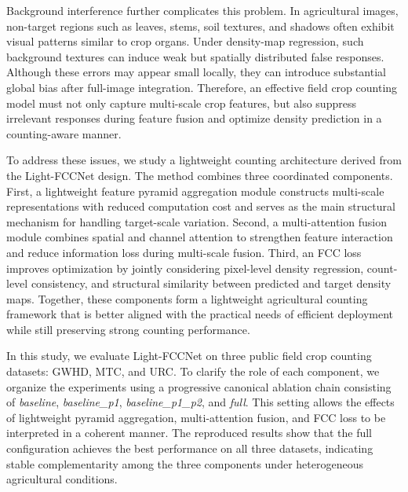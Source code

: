 \documentclass[a4paper,fleqn]{cas-sc}
\begin{document}
Background interference further complicates this problem. In agricultural images, non-target regions such as leaves, stems, soil textures, and shadows often exhibit visual patterns similar to crop organs. Under density-map regression, such background textures can induce weak but spatially distributed false responses. Although these errors may appear small locally, they can introduce substantial global bias after full-image integration. Therefore, an effective field crop counting model must not only capture multi-scale crop features, but also suppress irrelevant responses during feature fusion and optimize density prediction in a counting-aware manner.

To address these issues, we study a lightweight counting architecture derived from the Light-FCCNet design. The method combines three coordinated components. First, a lightweight feature pyramid aggregation module constructs multi-scale representations with reduced computation cost and serves as the main structural mechanism for handling target-scale variation. Second, a multi-attention fusion module combines spatial and channel attention to strengthen feature interaction and reduce information loss during multi-scale fusion. Third, an FCC loss improves optimization by jointly considering pixel-level density regression, count-level consistency, and structural similarity between predicted and target density maps. Together, these components form a lightweight agricultural counting framework that is better aligned with the practical needs of efficient deployment while still preserving strong counting performance.

In this study, we evaluate Light-FCCNet on three public field crop counting datasets: GWHD, MTC, and URC. To clarify the role of each component, we organize the experiments using a progressive canonical ablation chain consisting of \textit{baseline}, \textit{baseline\_p1}, \textit{baseline\_p1\_p2}, and \textit{full}. This setting allows the effects of lightweight pyramid aggregation, multi-attention fusion, and FCC loss to be interpreted in a coherent manner. The reproduced results show that the full configuration achieves the best performance on all three datasets, indicating stable complementarity among the three components under heterogeneous agricultural conditions.
\end{document}
